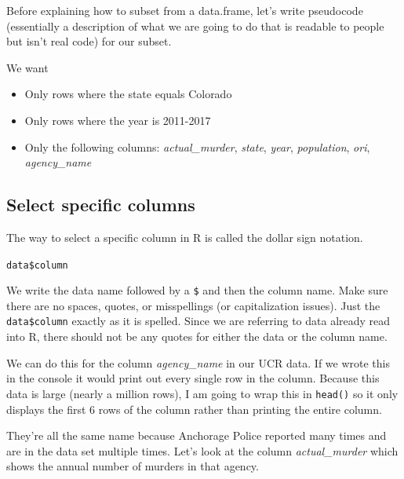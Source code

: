 \documentclass[
]{krantz}
\makeatletter
\newenvironment{Shaded}{\begin{snugshade}}{\end{snugshade}}
\newcommand{\CommentTok}[1]{\textcolor[rgb]{0.37,0.37,0.37}{\textit{#1}}}
\newcommand{\FunctionTok}[1]{\textcolor[rgb]{0,0,0}{#1}}
\newcommand{\NormalTok}[1]{#1}
\newcommand{\SpecialCharTok}[1]{\textcolor[rgb]{0,0,0}{#1}}
\providecommand{\tightlist}{%
  \setlength{\itemsep}{0pt}\setlength{\parskip}{0pt}}
\newenvironment{kframe}{%
\medskip{}
\setlength{\fboxsep}{.8em}
 \def\at@end@of@kframe{}%
 \ifinner\ifhmode%
  \def\at@end@of@kframe{\end{minipage}}%
  \begin{minipage}{\columnwidth}%
 \fi\fi%
 \def\FrameCommand##1{\hskip\@totalleftmargin \hskip-\fboxsep
 \colorbox{shadecolor}{##1}\hskip-\fboxsep
     \hskip-\linewidth \hskip-\@totalleftmargin \hskip\columnwidth}%
 \MakeFramed {\advance\hsize-\width
   \@totalleftmargin\z@ \linewidth\hsize
   \@setminipage}}%
 {\par\unskip\endMakeFramed%
 \at@end@of@kframe}
\renewenvironment{Shaded}{\begin{kframe}}{\end{kframe}}
\makeatother
\begin{document}
Before explaining how to subset from a data.frame, let's write pseudocode (essentially a description of what we are going to do that is readable to people but isn't real code) for our subset.

We want

\begin{itemize}
\tightlist
\item
  Only rows where the state equals Colorado
\item
  Only rows where the year is 2011-2017
\item
  Only the following columns: \emph{actual\_murder}, \emph{state}, \emph{year}, \emph{population}, \emph{ori}, \emph{agency\_name}
\end{itemize}

\hypertarget{select-specific-columns}{%
\subsection{Select specific columns}\label{select-specific-columns}}

The way to select a specific column in R is called the dollar sign notation.

\texttt{data\$column}

We write the data name followed by a \texttt{\$} and then the column name. Make sure there are no spaces, quotes, or misspellings (or capitalization issues). Just the \texttt{data\$column} exactly as it is spelled. Since we are referring to data already read into R, there should not be any quotes for either the data or the column name.

We can do this for the column \emph{agency\_name} in our UCR data. If we wrote this in the console it would print out every single row in the column. Because this data is large (nearly a million rows), I am going to wrap this in \texttt{head()} so it only displays the first 6 rows of the column rather than printing the entire column.

\begin{Shaded}
\end{Shaded}

They're all the same name because Anchorage Police reported many times and are in the data set multiple times. Let's look at the column \emph{actual\_murder} which shows the annual number of murders in that agency.
\end{document}
